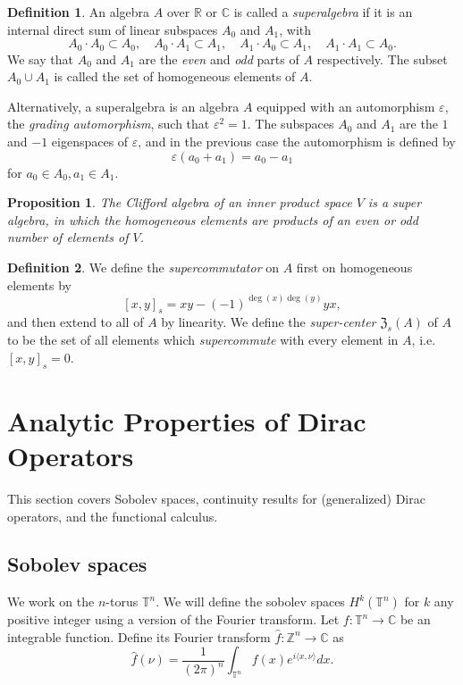 \documentclass[12pt, reqno]{extarticle}
\theoremstyle{plain}
\newtheorem{proposition}{Proposition}[section]
\theoremstyle{definition}
\newtheorem{definition}{Definition}[section]
\theoremstyle{remark}
\renewcommand{\epsilon}{\varepsilon}
\newcommand{\RR}{\mathbb{R}}
\newcommand{\ZZ}{\mathbb{Z}}
\newcommand{\CC}{\mathbb{C}}
\newcommand{\TT}{\mathbb{T}}
\begin{document}
\begin{definition}
    An algebra $A$ over $\RR$ or $\CC$ is called a \textit{superalgebra} 
    if it is an internal direct sum of linear subspaces $A_0$ and $A_1$, 
    with
    \[
        A_0\cdot A_0 \subset A_0, \quad A_0 \cdot A_1 \subset A_1, \quad 
        A_1\cdot A_0 \subset A_1, \quad A_1 \cdot A_1 \subset A_0.
    \]
    We say that $A_0$ and $A_1$ are the \textit{even} and \textit{odd} parts of $A$
    respectively. The subset $A_0\cup A_1$ is called the set of homogeneous elements of $A$. 

    Alternatively, a superalgebra is an algebra $A$ equipped with an automorphism 
    $\epsilon$, the \textit{grading automorphism}, such that $\epsilon^2 = 1$. 
    The subspaces $A_0$ and $A_1$ are the $1$ and $-1$ eigenspaces of $\epsilon$, 
    and in the previous case the automorphism is defined by
    \[
        \epsilon(a_0 + a_1) = a_0 - a_1
    \]
    for $a_0 \in A_0, a_1 \in A_1$. 
\end{definition}

\begin{proposition}
    The Clifford algebra of an inner product space $V$ is a super algebra, in which the homogeneous
    elements are products of an even or odd number of elements of $V$. 
\end{proposition}

\begin{definition}
    We define the \textit{supercommutator} on $A$ first on homogeneous elements by
    \[
        [x,y]_s = xy - (-1)^{\deg(x)\deg(y)}yx,
    \]
    and then extend to all of $A$ by linearity. We define the \textit{super-center}
    $\mathfrak{Z}_s(A)$ of $A$ to be the set of all elements which \textit{supercommute}
    with every element in $A$, i.e. $[x,y]_s = 0$.
\end{definition}

\section{Analytic Properties of Dirac Operators}

This section covers Sobolev spaces, continuity results for (generalized) Dirac operators, 
and the functional calculus. 

\subsection{Sobolev spaces}

We work on the $n$-torus $\TT^n$. We will define the sobolev spaces $H^k(\TT^n)$ for $k$ any positive 
integer using a version of the Fourier transform. Let $f: \TT^n \to \CC$ be an integrable function.
Define its Fourier transform $\widehat{f}: \ZZ^n \to \CC$ as 
\[
    \widehat{f}(\nu) = \frac{1}{{(2\pi)}^n}\int_{\TT^n}f(x)e^{i\langle x, \nu\rangle}dx.
\]
\end{document}
